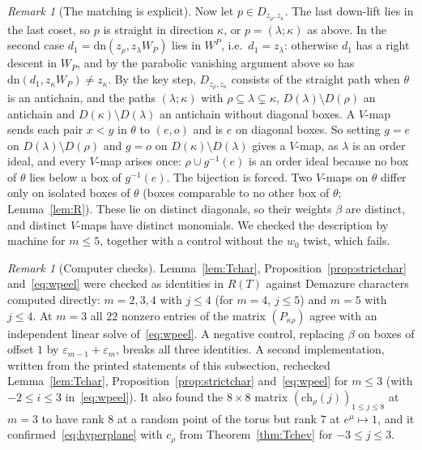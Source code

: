 \documentclass[11pt]{amsart}
\theoremstyle{definition}
\theoremstyle{remark}
\newtheorem{remark}[theorem]{Remark}
\begin{document}
\begin{remark}[The matching is explicit]
Now let $p\in D_{z_\rho,z_\kappa}$. The last down-lift lies in the last coset, so $p$ is straight in direction $\kappa$, or
$p=(\lambda;\kappa)$ as above. In the second case $d_1=\mathrm{dn}(z_\rho,z_\lambda W_P)$ lies in $W^P$, i.e.\ $d_1=z_\lambda$:
otherwise $d_1$ has a right descent in $W_P$, and by the parabolic vanishing argument above so has $\mathrm{dn}(d_1,z_\kappa
W_P)\ne z_\kappa$. By the key step, $D_{z_\rho,z_\kappa}$ consists of the straight path when $\theta$ is an antichain, and the
paths $(\lambda;\kappa)$ with $\rho\subseteq\lambda\subsetneq\kappa$, $D(\lambda)\setminus D(\rho)$ an antichain and
$D(\kappa)\setminus D(\lambda)$ an antichain without diagonal boxes. A $V$-map sends each pair $x<y$ in $\theta$ to $(e,o)$ and
is $e$ on diagonal boxes. So setting $g=e$ on $D(\lambda)\setminus D(\rho)$ and $g=o$ on $D(\kappa)\setminus D(\lambda)$ gives
a $V$-map, as $\lambda$ is an order ideal, and every $V$-map arises once: $\rho\cup g^{-1}(e)$ is an order ideal because no box
of $\theta$ lies below a box of $g^{-1}(e)$. The bijection is forced. Two $V$-maps on $\theta$
differ only on isolated boxes of $\theta$ (boxes comparable to no other box of $\theta$; Lemma~\ref{lem:R}). These lie on
distinct diagonals, so their weights $\beta$ are distinct, and distinct $V$-maps have distinct monomials.
We checked the description by machine for $m\le5$, together with a control without the $w_0$ twist, which fails.
\end{remark}

\begin{remark}[Computer checks]\label{rem:Tchecks}
Lemma~\ref{lem:Tchar}, Proposition~\ref{prop:strictchar} and~\eqref{eq:wpeel} were checked as identities in
$R(T)$ against Demazure characters computed directly: $m=2,3,4$ with $j\le4$ (for $m=4$, $j\le5$) and $m=5$
with $j\le4$. At $m=3$ all $22$ nonzero entries of the matrix $(P_{\kappa\rho})$ agree with an
independent linear solve of~\eqref{eq:wpeel}. A negative control, replacing $\beta$ on boxes of offset $1$ by
$\varepsilon_{m-1}+\varepsilon_m$, breaks all three identities. A second implementation, written from
the printed statements of this subsection, rechecked Lemma~\ref{lem:Tchar},
Proposition~\ref{prop:strictchar} and~\eqref{eq:wpeel} for $m\le3$ (with $-2\le i\le3$
in~\eqref{eq:wpeel}). It also found the $8\times8$ matrix $(\mathrm{ch}_\rho(j))_{1\le j\le8}$ at $m=3$ to
have rank $8$ at a random point of the torus but rank $7$ at $e^\mu\mapsto1$, and it
confirmed~\eqref{eq:hyperplane} with $c_\rho$ from Theorem~\ref{thm:Tchev} for $-3\le j\le3$.
\end{remark}
\end{document}

